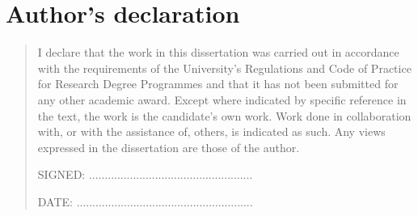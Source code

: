 %
\chapter*{Author's declaration}
\begin{quote}
I declare that the work in this dissertation was carried out in accordance with the requirements of the University's Regulations and Code of Practice for Research Degree Programmes and that it  has not been submitted for any other academic award. Except where indicated by specific  reference in the text, the work is the candidate's own work. Work done in collaboration with, or with the assistance of, others, is indicated as such. Any views expressed in the dissertation are those of the author.

\vspace{1.5cm}
\noindent
\hspace{-0.75cm}\textsc{SIGNED: ....................................................}

\noindent
\hspace{-0.75cm}\textsc{DATE: ........................................................}
\end{quote}
\clearpage
\cleardoublepage
